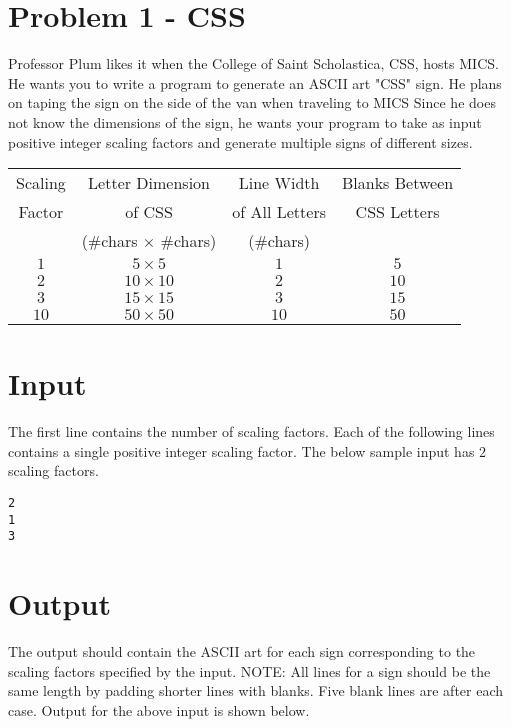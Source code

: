 \documentclass{article}
\begin{document}

\section*{Problem 1 - CSS}

Professor Plum likes it when the College of Saint Scholastica, CSS, hosts MICS. He wants you to write a program to generate an ASCII art "CSS" sign. He plans on taping the sign on the side of the van when traveling to MICS  Since he does not know the dimensions of the sign, he wants your program to take as input positive integer scaling factors and generate multiple signs of different sizes.

\begin{center}
\begin{tabular}{|c|c|c|c|}
\hline
Scaling & Letter Dimension & Line Width & Blanks Between \\
Factor & of CSS & of All Letters & CSS Letters \\ 
 & (\#chars $\times$ \#chars) & (\#chars) &  \\ \hline
$1$ & $5 \times 5$ & $1$ & $5$ \\ \hline
$2$ & $10 \times 10$ & $2$ & $10$ \\ \hline
$3$ & $15 \times 15$ & $3$ & $15$ \\ \hline
$10$ & $50 \times 50$ & $10$ & $50$ \\ \hline
\end{tabular}
\end{center}

\section*{Input}
The first line contains the number of scaling factors. Each of the following lines contains a single positive integer scaling factor. The below sample input has $2$ scaling factors.
\begin{verbatim}
2
1
3
\end{verbatim}
\section*{Output}
The output should contain the ASCII art for each sign corresponding to the scaling factors specified by the input.  NOTE: All lines for a sign should be the same length by padding shorter lines with blanks. Five blank lines are after each case. Output for the above input is shown below.
\end{document}
